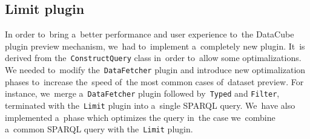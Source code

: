\subsection{Limit plugin}
In order to~bring a~better performance and user experience to~the DataCube plugin
preview mechanism, we~had to~implement a~completely new plugin. It~is derived 
from the~\texttt{ConstructQuery} class in~order to~allow some optimalizations. 
We needed to~modify the~\texttt{DataFetcher} plugin and introduce new 
optimalization phases to~increase the~speed of~the most common cases of~dataset 
preview. For instance, we~merge a~\texttt{DataFetcher} plugin followed by~\texttt{Typed} and \texttt{Filter}, terminated with the~\texttt{Limit} plugin 
into a~single SPARQL query. We~have also implemented a~phase which optimizes
the query in~the case we~combine a~common SPARQL query with the~\texttt{Limit} plugin.
